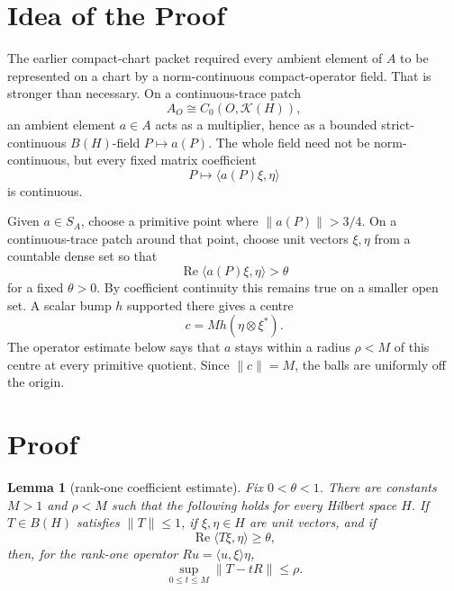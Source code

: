 \documentclass[11pt]{article}
\newtheorem{lemma}{Lemma}
\newcommand{\Kcal}{\mathcal K}
\begin{document}
\section*{Idea of the Proof}

The earlier compact-chart packet required every ambient element of \(A\) to
be represented on a chart by a norm-continuous compact-operator field.  That
is stronger than necessary.  On a continuous-trace patch
\[
        A_O\cong C_0(O,\Kcal(H)),
\]
an ambient element \(a\in A\) acts as a multiplier, hence as a bounded
strict-continuous \(B(H)\)-field \(P\mapsto a(P)\).  The whole field need not
be norm-continuous, but every fixed matrix coefficient
\[
        P\longmapsto \langle a(P)\xi,\eta\rangle
\]
is continuous.

Given \(a\in S_A\), choose a primitive point where \(\|a(P)\|>3/4\).  On a
continuous-trace patch around that point, choose unit vectors \(\xi,\eta\)
from a countable dense set so that
\[
        \operatorname{Re}\langle a(P)\xi,\eta\rangle>\theta
\]
for a fixed \(\theta>0\).  By coefficient continuity this remains true on a
smaller open set.  A scalar bump \(h\) supported there gives a centre
\[
        c=Mh(\eta\otimes\xi^*).
\]
The operator estimate below says that \(a\) stays within a radius \(\rho<M\)
of this centre at every primitive quotient.  Since \(\|c\|=M\), the balls are
uniformly off the origin.

\section*{Proof}

\begin{lemma}[rank-one coefficient estimate]
\label{lem:rankone}
Fix \(0<\theta<1\).  There are constants \(M>1\) and \(\rho<M\) such that the
following holds for every Hilbert space \(H\).  If \(T\in B(H)\) satisfies
\(\|T\|\le1\), if \(\xi,\eta\in H\) are unit vectors, and if
\[
        \operatorname{Re}\langle T\xi,\eta\rangle\ge\theta,
\]
then, for the rank-one operator \(R u=\langle u,\xi\rangle\eta\),
\[
        \sup_{0\le t\le M}\|T-tR\|\le \rho.
\]
\end{lemma}
\end{document}
